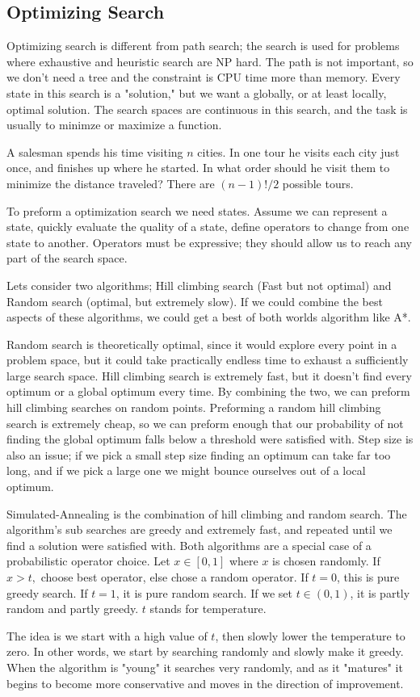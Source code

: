 \documentclass{chezarticle}
\begin{document}
\subsection{Optimizing Search}
Optimizing search is different from path search; the search is used for problems where exhaustive and heuristic search are NP hard. The path is not important, so we don't need a tree and the constraint is CPU time more than memory. Every state in this search is a "solution," but we want a globally, or at least locally, optimal solution. The search spaces are continuous in this search, and the task is usually to minimze or maximize a function.\\
\begin{example}
A salesman spends his time visiting $n$ cities. In one tour he visits each city just once, and finishes up where he started. In what order should he visit them to minimize the distance traveled? There are $(n -1)!/2$ possible tours.
\end{example}
To preform a optimization search we need states. Assume we can represent a state, quickly evaluate the quality of a state, define operators to change from one state to another. Operators must be expressive; they should allow us to reach any part of the search space. 
\begin{proposition}
Lets consider two algorithms; Hill climbing search (Fast but not optimal) and Random search (optimal, but extremely slow). If we could combine the best aspects of these algorithms, we could get a best of both worlds algorithm like A*.
\end{proposition}
Random search is theoretically optimal, since it would explore every point in a problem space, but it could take practically endless time to exhaust a sufficiently large search space. Hill climbing search is extremely fast, but it doesn't find every optimum or a global optimum every time. By combining the two, we can preform hill climbing searches on random points. Preforming a random hill climbing search is extremely cheap, so we can preform enough that our probability of not finding the global optimum falls below a threshold were satisfied with. Step size is also an issue; if we pick a small step size finding an optimum can take far too long, and if we pick a large one we might bounce ourselves out of a local optimum. 
\begin{algorithm}
Simulated-Annealing is the combination of hill climbing and random search. The algorithm's sub searches are greedy and extremely fast, and repeated until we find a solution were satisfied with. Both algorithms are a special case of a probabilistic operator choice. Let $x \in [0,1]$ where $x$ is chosen randomly. If $x > t,$ choose best operator, else   chose a random operator. If $t=0$, this is pure greedy search. If $t = 1$, it is pure random search. If we set $t \in (0,1)$, it is partly random and partly greedy. $t$ stands for temperature.
\end{algorithm}
The idea is we start with a high value of $t$, then slowly lower the temperature to zero. In other words, we start by searching randomly and slowly make it greedy. When the algorithm is "young" it searches very randomly, and as it "matures" it begins to become more conservative and moves in the direction of improvement. 
\end{document}
